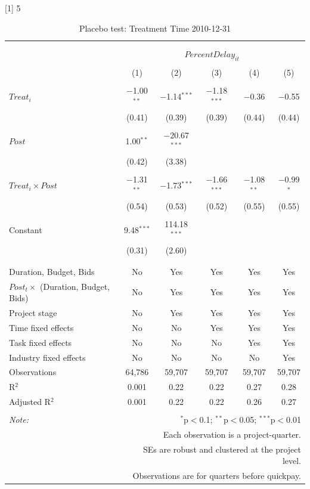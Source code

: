 \documentclass[
]{article}
\begin{document}
{[}1{]} 5

\begin{table}[H] \centering 
  \caption{Placebo test: Treatment Time 2010-12-31} 
  \label{} 
\small 
\begin{tabular}{@{\extracolsep{-2pt}}lccccc} 
\\[-1.8ex]\hline 
\hline \\[-1.8ex] 
\\[-1.8ex] & \multicolumn{5}{c}{$PercentDelay_{it}$} \\ 
\\[-1.8ex] & (1) & (2) & (3) & (4) & (5)\\ 
\hline \\[-1.8ex] 
 $Treat_i$ & $-$1.00$^{**}$ & $-$1.14$^{***}$ & $-$1.18$^{***}$ & $-$0.36 & $-$0.55 \\ 
  & (0.41) & (0.39) & (0.39) & (0.44) & (0.44) \\ 
  & & & & & \\ 
 $Post$ & 1.00$^{**}$ & $-$20.67$^{***}$ &  &  &  \\ 
  & (0.42) & (3.38) &  &  &  \\ 
  & & & & & \\ 
 $Treat_i \times Post$ & $-$1.31$^{**}$ & $-$1.73$^{***}$ & $-$1.66$^{***}$ & $-$1.08$^{**}$ & $-$0.99$^{*}$ \\ 
  & (0.54) & (0.53) & (0.52) & (0.55) & (0.55) \\ 
  & & & & & \\ 
 Constant & 9.48$^{***}$ & 114.18$^{***}$ &  &  &  \\ 
  & (0.31) & (2.60) &  &  &  \\ 
  & & & & & \\ 
\hline \\[-1.8ex] 
Duration, Budget, Bids & No & Yes & Yes & Yes & Yes \\ 
$Post_t \times$  (Duration, Budget, Bids) & No & Yes & Yes & Yes & Yes \\ 
Project stage & No & Yes & Yes & Yes & Yes \\ 
Time fixed effects & No & No & Yes & Yes & Yes \\ 
Task fixed effects & No & No & No & Yes & Yes \\ 
Industry fixed effects & No & No & No & No & Yes \\ 
Observations & 64,786 & 59,707 & 59,707 & 59,707 & 59,707 \\ 
R$^{2}$ & 0.001 & 0.22 & 0.22 & 0.27 & 0.28 \\ 
Adjusted R$^{2}$ & 0.001 & 0.22 & 0.22 & 0.26 & 0.27 \\ 
\hline 
\hline \\[-1.8ex] 
\textit{Note:}  & \multicolumn{5}{r}{$^{*}$p$<$0.1; $^{**}$p$<$0.05; $^{***}$p$<$0.01} \\ 
 & \multicolumn{5}{r}{Each observation is a project-quarter.} \\ 
 & \multicolumn{5}{r}{SEs are robust and clustered at the project level.} \\ 
 & \multicolumn{5}{r}{Observations are for quarters before quickpay.} \\ 
\end{tabular} 
\end{table}
\end{document}
